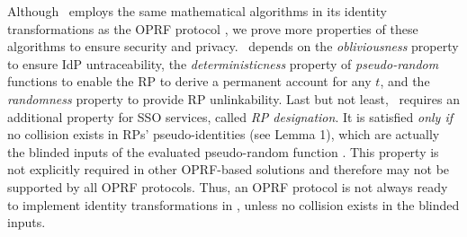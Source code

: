 


Although \usso\ employs the same mathematical algorithms in its identity transformations as the OPRF protocol \cite{oprf-proved,voprf-proved},
 we prove more properties of these algorithms %
 to ensure security and privacy. %
\usso\ depends on the \emph{obliviousness} property to 
    ensure IdP untraceability,
    the \emph{deterministicness} property of \emph{pseudo-random} functions to enable the RP to derive a permanent account for any $t$,
and the \emph{randomness} property to provide RP unlinkability.
Last but not least, \usso\ requires an additional property for SSO services, called \emph{RP designation}.
It is satisfied \emph{only if} no collision exists in RPs' pseudo-identities (see Lemma 1), which are actually the blinded inputs of the evaluated pseudo-random function \cite{oprf-proved,voprf-proved}.
This property   %
is not explicitly required in other OPRF-based solutions and therefore may not be supported by all OPRF protocols.
Thus, an OPRF protocol is not always ready to implement identity transformations in \usso, unless no collision exists in the blinded inputs.  %

